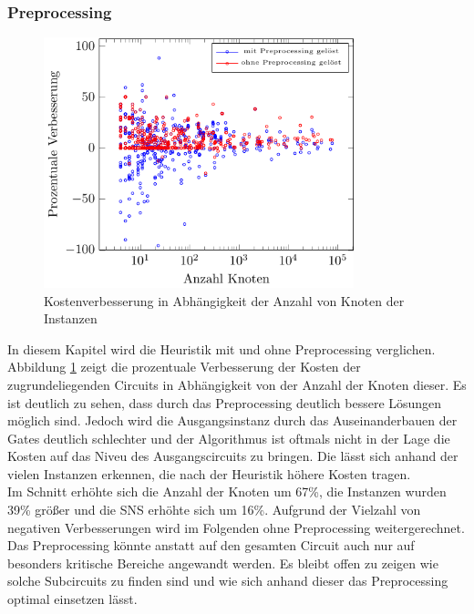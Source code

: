 \documentclass[11pt, a4paper, german]{article}
\begin{document}
\subsubsection{Preprocessing}
\begin{figure}[h]
		\centering
		\includegraphics[width = 9cm]{pictures/tex_files/analysis/decomp_test}
		\caption{Kostenverbesserung in Abh\"angigkeit der Anzahl von Knoten der Instanzen}
		\label{bild:decomp_test}
\end{figure}
In diesem Kapitel wird die Heuristik mit und ohne Preprocessing verglichen. Abbildung \ref{bild:decomp_test} zeigt die prozentuale Verbesserung der Kosten der zugrundeliegenden Circuits in Abh\"angigkeit von der Anzahl der Knoten dieser. Es ist deutlich zu sehen, dass durch das Preprocessing deutlich bessere L\"osungen m\"oglich sind. Jedoch wird die Ausgangsinstanz durch das Auseinanderbauen der Gates deutlich schlechter und der Algorithmus ist oftmals nicht in der Lage die Kosten auf das Niveu des Ausgangscircuits zu bringen. Die l\"asst sich anhand der vielen Instanzen erkennen, die nach der Heuristik h\"ohere Kosten tragen.\\
Im Schnitt erh\"ohte sich die Anzahl der Knoten um  67\%, die Instanzen wurden 39\% grö{\ss}er und die SNS erh\"ohte sich um 16\%. Aufgrund der Vielzahl von negativen Verbesserungen wird im Folgenden ohne Preprocessing weitergerechnet. \\
Das Preprocessing k\"onnte anstatt auf den gesamten Circuit auch nur auf besonders kritische Bereiche angewandt werden. Es bleibt offen zu zeigen wie solche Subcircuits zu finden sind und wie sich anhand dieser das Preprocessing optimal einsetzen l\"asst.
\end{document}
